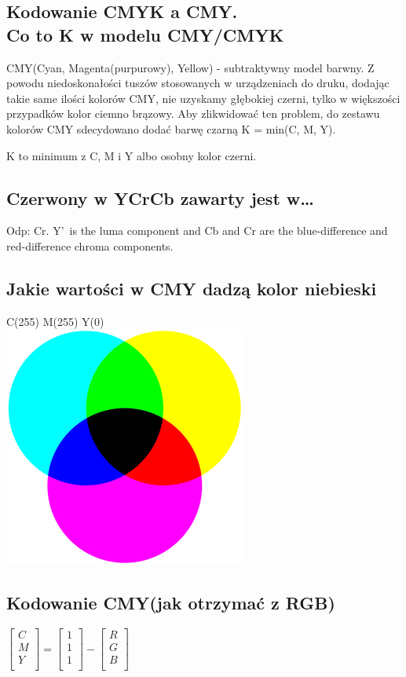 \documentclass[a4paper, 12pt, titlepage]{article}
\begin{document}
\subsection{Kodowanie CMYK a CMY. \\ Co to K w modelu CMY/CMYK}
CMY(Cyan, Magenta(purpurowy), Yellow) - subtraktywny model barwny.
Z powodu niedoskonałości tuszów stosowanych w urządzeniach do druku, dodając takie same ilości kolorów CMY, nie uzyskamy głębokiej czerni, tylko w większości przypadków kolor ciemno brązowy. Aby zlikwidować ten problem, do zestawu kolorów CMY sdecydowano dodać barwę czarną K = min(C, M, Y).\par
K to minimum z C, M i Y albo osobny kolor czerni.

\subsection{Czerwony w YCrCb zawarty jest w…}
Odp: Cr. Y\textquoteright~is the luma component and Cb and Cr are the blue-difference and red-difference chroma components.

\subsection{Jakie wartości w CMY dadzą kolor niebieski}
C(255) M(255) Y(0) \\
\includegraphics[scale=0.8]{CMY_ideal.png}

\subsection{Kodowanie CMY(jak otrzymać z RGB)}
$\begin{bmatrix} C \\ M \\ Y \\ \end{bmatrix} 
= \begin{bmatrix} 1 \\ 1 \\ 1 \\ \end{bmatrix}
- \begin{bmatrix} R \\ G \\ B \\ \end{bmatrix} $
\end{document}
